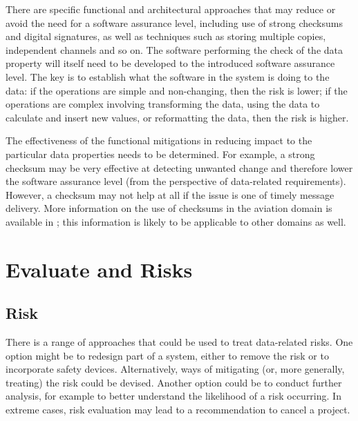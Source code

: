 There are specific functional and architectural approaches that may reduce or avoid the need for a \gls{software assurance level}, including use of strong checksums and digital signatures, as well as techniques such as storing multiple copies, independent channels and so on. The software performing the check of the \gls{data property} will itself need to be developed to the introduced \gls{software assurance level}. The key is to establish what the software in the system is doing to the data: if the operations are simple and non-changing, then the risk is lower; if the operations are complex involving transforming the data, using the data to calculate and insert new values, or reformatting the data, then the risk is higher.

The effectiveness of the functional \glspl{mitigation} in reducing impact to the particular data properties needs to be determined. For example, a strong checksum may be very effective at detecting unwanted change and therefore lower the \gls{software assurance level} (from the perspective of data-related requirements). However, a checksum may not help at all if the issue is one of timely message delivery. More \gls{information} on the use of checksums in the aviation domain is available in \cite{citation:koopman2015selection}; this \gls{information} is likely to be applicable to other domains as well.

\clearpage %
\section{Evaluate and  Risks}
\label{bkm:EvaluateAndTreat}
\subsection{Risk }
There is a range of approaches that could be used to \gls{treat} data-related risks. One option might be to redesign part of a system, either to remove the risk or to incorporate safety devices. Alternatively, ways of mitigating (or, more generally, treating) the risk could be devised. Another option could be to conduct further analysis, for example to better understand the likelihood of a risk occurring. In extreme cases, risk evaluation may lead to a recommendation to cancel a project.

